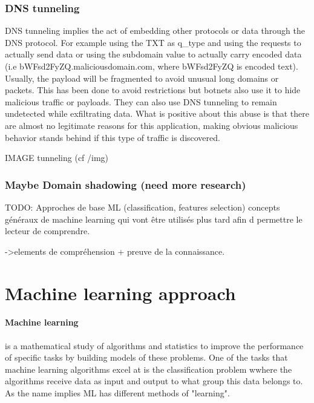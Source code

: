 \subsubsection{DNS tunneling}
DNS tunneling implies the act of embedding other protocols or data through the DNS protocol. For example using the TXT  as q\_type and using the requests to actually send data or  using the subdomain value to actually carry encoded data (i.e bWFsd2FyZQ.maliciousdomain.com, where bWFsd2FyZQ is encoded text). Usually, the payload will be fragmented to avoid unusual long domains or packets. This has been done to avoid restrictions but botnets also use it to hide malicious traffic or payloads. They can also use DNS tunneling to remain undetected while exfiltrating data. \cite{Botnet1}
What is positive about this abuse is that there are almost no legitimate reasons for this application, making obvious malicious behavior stands behind if this type of traffic is discovered.\cite{tunneling}

IMAGE tunneling (cf /img)


\subsubsection{Maybe Domain shadowing (need more research)}
\cite{review2}


TODO: Approches de base ML (classification, features selection)
concepts généraux de machine learning qui vont être utilisés plus tard
afin d permettre le lecteur de comprendre. 

->elements de compréhension + preuve de la connaissance. 

\cite{detection8}
\section{Machine learning approach}
\paragraph{Machine learning} is a mathematical study of algorithms and statistics to improve the performance of specific tasks by building models of these problems. One of the tasks that machine learning algorithms excel at is the classification problem wwhere the algorithms receive data as input and output to what group this data belongs to. As the name implies ML has different methods of "learning".


